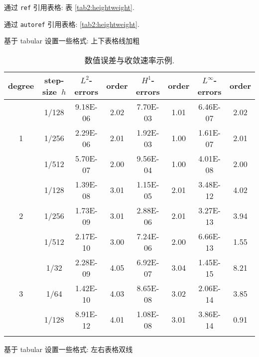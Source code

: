 \documentclass{shnuthesis}
\begin{document}
通过 \verb|ref| 引用表格: 表 \ref{tab2:heightweight}.

通过 \verb|autoref| 引用表格: \autoref{tab2:heightweight}.


\clearpage
基于 tabular 设置一些格式: 上下表格线加粗

\begin{table}[!htp]
\centering
\caption{数值误差与收敛速率示例.}
\renewcommand\arraystretch{1.2} %
\label{table1}
\begin{tabular}{c|c|cc|cc|cc}
\Xhline{2\arrayrulewidth}
degree &  step-size~$h$  & $L^2$-errors  &  order  & $H^1$-errors & order & $L^\infty$-errors  &  order \\
\hline
   &  1/128    & 9.18E-06    &2.02    & 7.70E-03  &1.01       & 6.46E-07    &2.02    \\
1  &  1/256    & 2.29E-06    &2.01    & 1.92E-03  &1.00       & 1.61E-07    &2.01      \\
   &  1/512    & 5.70E-07    &2.00    & 9.56E-04  &1.00       & 4.01E-08    &2.00       \\
\hline  %
   &  1/128    & 1.39E-08    &3.01    & 1.15E-05  &2.01       & 3.48E-12   &4.02       \\
2  &  1/256    & 1.73E-09    &3.01    & 2.88E-06  &2.01       & 3.27E-13   &3.94      \\
   &  1/512    & 2.17E-10    &3.00    & 7.24E-06  &2.00       & 6.66E-13   &1.55     \\
\hline  %
   &  1/32     & 2.28E-09    &4.05    & 6.92E-07  &3.04       & 1.45E-15   &8.21       \\
3  &  1/64     & 1.42E-10    &4.03    & 8.65E-08  &3.02       & 2.06E-14   &3.85       \\
   &  1/128    & 8.91E-12    &4.01    & 1.08E-08  &3.01       & 3.86E-14   &0.91       \\
\Xhline{2\arrayrulewidth}
\end{tabular}
\end{table}

基于 tabular 设置一些格式: 左右表格双线
\end{document}
